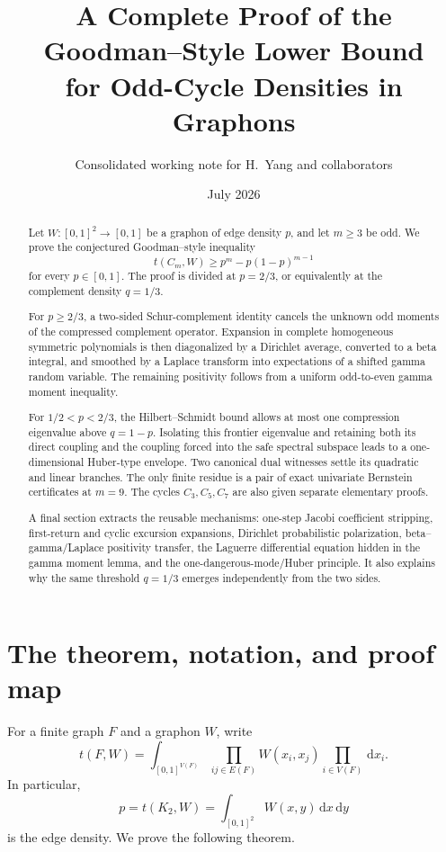 \documentclass[11pt]{article}
\title{A Complete Proof of the Goodman--Style Lower Bound\\
for Odd-Cycle Densities in Graphons}
\author{Consolidated working note for H.~Yang and collaborators}
\date{July 2026}
\numberwithin{equation}{section}
\newcommand{\dd}{\,\mathrm d}
\begin{document}
\maketitle

\begin{abstract}
  Let $W:[0,1]^2\to[0,1]$ be a graphon of edge density $p$, and let
  $m\ge3$ be odd.  We prove the conjectured Goodman--style inequality
  \[
    t(C_m,W)\ge p^m-p(1-p)^{m-1}
  \]
  for every $p\in[0,1]$.  The proof is divided at $p=2/3$, or equivalently
  at the complement density $q=1/3$.

  For $p\ge2/3$, a two-sided Schur-complement identity cancels the unknown
  odd moments of the compressed complement operator.  Expansion in complete
  homogeneous symmetric polynomials is then diagonalized by a Dirichlet
  average, converted to a beta integral, and smoothed by a Laplace transform
  into expectations of a shifted gamma random variable.  The remaining
  positivity follows from a uniform odd-to-even gamma moment inequality.

  For $1/2<p<2/3$, the Hilbert--Schmidt bound allows at most one compression
  eigenvalue above $q=1-p$.  Isolating this frontier eigenvalue and retaining
  both its direct coupling and the coupling forced into the safe spectral
  subspace leads to a one-dimensional Huber-type envelope.  Two canonical
  dual witnesses settle its quadratic and linear branches.  The only finite
  residue is a pair of exact univariate Bernstein certificates at $m=9$.
  The cycles $C_3,C_5,C_7$ are also given separate elementary proofs.

  A final section extracts the reusable mechanisms: one-step Jacobi
  coefficient stripping, first-return and cyclic excursion expansions,
  Dirichlet probabilistic polarization, beta--gamma/Laplace positivity
  transfer, the Laguerre differential equation hidden in the gamma moment
  lemma, and the one-dangerous-mode/Huber principle.  It also explains why the
  same threshold $q=1/3$ emerges independently from the two sides.
\end{abstract}

\tableofcontents

\section{The theorem, notation, and proof map}\label{sec:intro}

For a finite graph $F$ and a graphon $W$, write
\[
  t(F,W)=\int_{[0,1]^{V(F)}}
  \prod_{ij\in E(F)}W(x_i,x_j)
  \prod_{i\in V(F)}\dd x_i.
\]
In particular,
\[
  p=t(K_2,W)=\int_{[0,1]^2}W(x,y)\dd x\dd y
\]
is the edge density.  We prove the following theorem.
\end{document}
